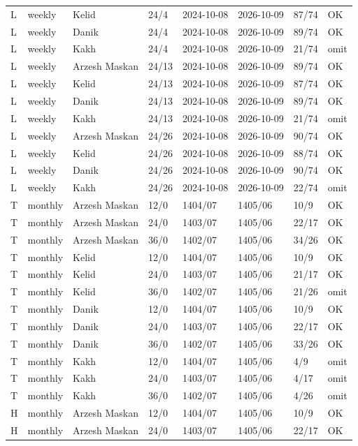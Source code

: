 \documentclass[11pt,a4paper]{article}
\begin{document}
\begin{longtable}{llllllll}
L & weekly & Kelid & 24/4 & 2024-10-08 & 2026-10-09 & 87/74 & OK \\
L & weekly & Danik & 24/4 & 2024-10-08 & 2026-10-09 & 89/74 & OK \\
L & weekly & Kakh & 24/4 & 2024-10-08 & 2026-10-09 & 21/74 & omit \\
L & weekly & Arzesh Maskan & 24/13 & 2024-10-08 & 2026-10-09 & 89/74 & OK \\
L & weekly & Kelid & 24/13 & 2024-10-08 & 2026-10-09 & 87/74 & OK \\
L & weekly & Danik & 24/13 & 2024-10-08 & 2026-10-09 & 89/74 & OK \\
L & weekly & Kakh & 24/13 & 2024-10-08 & 2026-10-09 & 21/74 & omit \\
L & weekly & Arzesh Maskan & 24/26 & 2024-10-08 & 2026-10-09 & 90/74 & OK \\
L & weekly & Kelid & 24/26 & 2024-10-08 & 2026-10-09 & 88/74 & OK \\
L & weekly & Danik & 24/26 & 2024-10-08 & 2026-10-09 & 90/74 & OK \\
L & weekly & Kakh & 24/26 & 2024-10-08 & 2026-10-09 & 22/74 & omit \\
T & monthly & Arzesh Maskan & 12/0 & 1404/07 & 1405/06 & 10/9 & OK \\
T & monthly & Arzesh Maskan & 24/0 & 1403/07 & 1405/06 & 22/17 & OK \\
T & monthly & Arzesh Maskan & 36/0 & 1402/07 & 1405/06 & 34/26 & OK \\
T & monthly & Kelid & 12/0 & 1404/07 & 1405/06 & 10/9 & OK \\
T & monthly & Kelid & 24/0 & 1403/07 & 1405/06 & 21/17 & OK \\
T & monthly & Kelid & 36/0 & 1402/07 & 1405/06 & 21/26 & omit \\
T & monthly & Danik & 12/0 & 1404/07 & 1405/06 & 10/9 & OK \\
T & monthly & Danik & 24/0 & 1403/07 & 1405/06 & 22/17 & OK \\
T & monthly & Danik & 36/0 & 1402/07 & 1405/06 & 33/26 & OK \\
T & monthly & Kakh & 12/0 & 1404/07 & 1405/06 & 4/9 & omit \\
T & monthly & Kakh & 24/0 & 1403/07 & 1405/06 & 4/17 & omit \\
T & monthly & Kakh & 36/0 & 1402/07 & 1405/06 & 4/26 & omit \\
H & monthly & Arzesh Maskan & 12/0 & 1404/07 & 1405/06 & 10/9 & OK \\
H & monthly & Arzesh Maskan & 24/0 & 1403/07 & 1405/06 & 22/17 & OK \\

\end{longtable}
\end{document}
